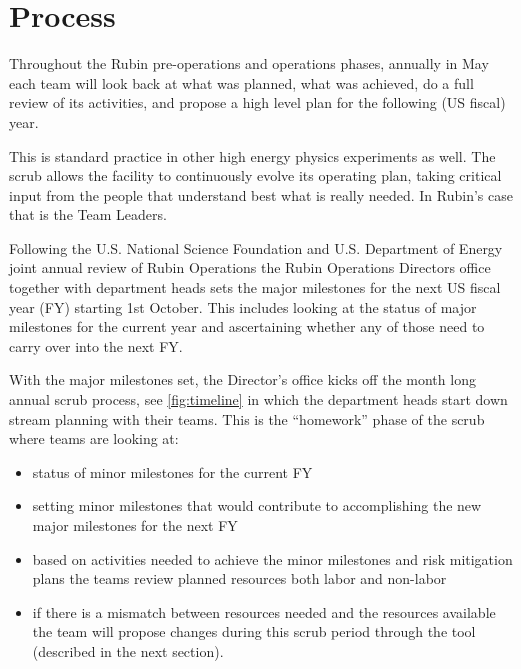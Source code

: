 \section{Process} \label{sec:process}


Throughout the Rubin pre-operations and operations phases, annually in May each team will look back at what was planned, what was achieved, do a full review of its activities, and propose a high level plan for the following (US fiscal) year.

This is standard practice in other high energy physics experiments as well. The scrub allows the facility to continuously evolve its operating plan, taking critical input from the people that understand best what is really needed. In Rubin’s case that is the Team Leaders.

Following the U.S. National Science Foundation and U.S. Department of Energy joint annual review of Rubin Operations the Rubin Operations Directors office together with department heads sets the major milestones for the next US fiscal year (FY) starting 1st October. This includes looking at the status of major milestones for the current year and ascertaining whether any of those need to carry over into the next FY.

With the major milestones set, the Director’s office kicks off the month long annual scrub process, see \autoref{fig:timeline} in which the department heads start down stream planning with their teams. This is the “homework” phase of the scrub where teams are looking at:

\begin{itemize}
\item status of minor milestones for the current FY
\item setting minor milestones that would contribute to accomplishing the new major milestones for the next FY
\item based on activities needed to achieve the minor milestones and risk mitigation plans the teams review planned resources both labor and non-labor
\item if there is a mismatch between resources needed and the resources available the team will propose changes during this scrub period through the tool (described in the next section).

\end{itemize}


